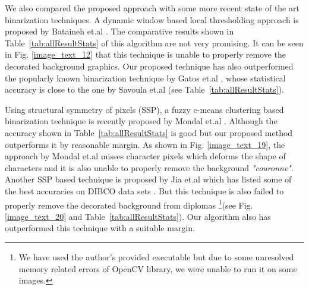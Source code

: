 \documentclass[runningheads]{llncs}
\begin{document}
We also compared the proposed approach with some more recent state of the art binarization techniques. A dynamic window based local thresholding approach is proposed by Bataineh et.al  \cite{Bataineh2011}. The comparative results shown in Table~\ref{tab:allResultStats} of this algorithm are not very promising. It can be seen in Fig. \ref{image_text_12} that this technique is unable to properly remove the decorated background graphics. Our proposed technique has also outperformed the popularly known binarization technique by Gatos et.al \cite{Gatos2006}, whose statistical accuracy is close to the one by Savoula et.al \cite{Pratikakis2018} (see Table~\ref{tab:allResultStats}).  

Using structural symmetry of pixels (SSP), a fuzzy c-means clustering based binarization technique is recently proposed by Mondal et.al \cite{Mondal2019}. Although the accuracy shown in Table~\ref{tab:allResultStats} is good but our proposed method outperforms it by reasonable margin. As shown in Fig. \ref{image_text_19}, the approach by Mondal et.al misses character pixels which deforms the shape of characters and it is also unable to properly remove the background \textit{"couronne"}. Another SSP based technique is proposed by Jia et.al \cite{Jia2018} which has listed some of the best accuracies on DIBCO data sets \cite{Pratikakis2018}. But this technique is also failed to properly remove the decorated background from diplomas \footnote{We have used the author's provided executable but due to some unresolved memory related errors of OpenCV library, we were unable to run it on some images.}(see Fig. \ref{image_text_20} and Table~\ref{tab:allResultStats}). Our algorithm also has outperformed this technique with a suitable margin.   
\end{document}
